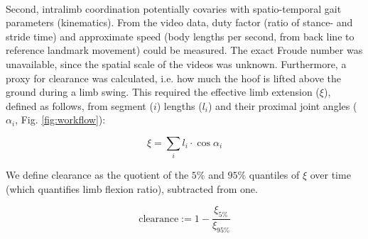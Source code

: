 \\Second, intralimb coordination potentially covaries with spatio-temporal gait parameters (kinematics).
From the video data, duty factor (ratio of stance- and stride time) and approximate speed (body lengths per second, from back line to reference landmark movement) could be measured.
The exact Froude number was unavailable, since the spatial scale of the videos was unknown.
Furthermore, a proxy for clearance \cite[\textit{cf.}][]{Austin1999} was calculated, i.e. how much the hoof is lifted above the ground during a limb swing.
This required the effective limb extension ($\xi$), defined as follows, from segment ($i$) lengths ($l_{i}$) and their proximal joint angles ($\alpha_{i}$, Fig. \ref{fig:workflow}):

\begin{equation*}
\xi = \sum\limits_{i} l_{i} \cdot \cos{\alpha_{i}}
\end{equation*}

We define clearance as the quotient of the $5\%$ and $95\%$ quantiles of $\xi$ over time (which quantifies limb flexion ratio), subtracted from one.

\begin{equation*}
\text{clearance} := 1 - \frac{\xi_{5\%}}{\xi_{95\%}}
\end{equation*}

